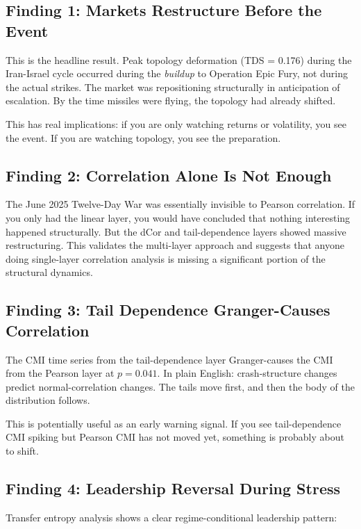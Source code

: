 \documentclass[12pt, letterpaper]{article}
\begin{document}
\subsection{Finding 1: Markets Restructure Before the Event}

This is the headline result. Peak topology deformation (TDS = 0.176) during the Iran-Israel cycle occurred during the \textit{buildup} to Operation Epic Fury, not during the actual strikes. The market was repositioning structurally in anticipation of escalation. By the time missiles were flying, the topology had already shifted.

This has real implications: if you are only watching returns or volatility, you see the event. If you are watching topology, you see the preparation.

\subsection{Finding 2: Correlation Alone Is Not Enough}

The June 2025 Twelve-Day War was essentially invisible to Pearson correlation. If you only had the linear layer, you would have concluded that nothing interesting happened structurally. But the dCor and tail-dependence layers showed massive restructuring. This validates the multi-layer approach and suggests that anyone doing single-layer correlation analysis is missing a significant portion of the structural dynamics.

\subsection{Finding 3: Tail Dependence Granger-Causes Correlation}

The CMI time series from the tail-dependence layer Granger-causes the CMI from the Pearson layer at $p = 0.041$. In plain English: crash-structure changes predict normal-correlation changes. The tails move first, and then the body of the distribution follows.

This is potentially useful as an early warning signal. If you see tail-dependence CMI spiking but Pearson CMI has not moved yet, something is probably about to shift.

\subsection{Finding 4: Leadership Reversal During Stress}

Transfer entropy analysis shows a clear regime-conditional leadership pattern:
\end{document}
